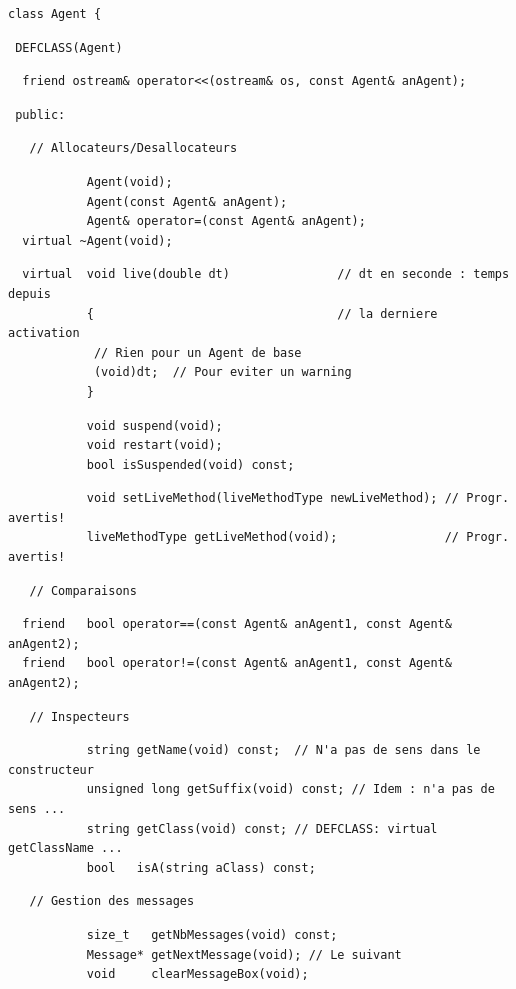 \documentclass[12pt]{article}
\begin{document}
\begin{small}
\begin{verbatim}
class Agent {
\end{verbatim}
\begin{verbatim}
 DEFCLASS(Agent)
\end{verbatim}
\begin{verbatim}
  friend ostream& operator<<(ostream& os, const Agent& anAgent);
\end{verbatim}
\begin{verbatim}
 public:
\end{verbatim}
\begin{verbatim}
   // Allocateurs/Desallocateurs
\end{verbatim}
\begin{verbatim}
           Agent(void);
           Agent(const Agent& anAgent);
           Agent& operator=(const Agent& anAgent);
  virtual ~Agent(void);
\end{verbatim}
\begin{verbatim}
  virtual  void live(double dt)               // dt en seconde : temps depuis
           {                                  // la derniere activation
            // Rien pour un Agent de base
            (void)dt;  // Pour eviter un warning
           }
\end{verbatim}
\begin{verbatim}
           void suspend(void);
           void restart(void);
           bool isSuspended(void) const;
\end{verbatim}
\begin{verbatim}
           void setLiveMethod(liveMethodType newLiveMethod); // Progr. avertis!
           liveMethodType getLiveMethod(void);               // Progr. avertis!
\end{verbatim}
\begin{verbatim}
   // Comparaisons
\end{verbatim}
\begin{verbatim}
  friend   bool operator==(const Agent& anAgent1, const Agent& anAgent2);
  friend   bool operator!=(const Agent& anAgent1, const Agent& anAgent2);
\end{verbatim}
\begin{verbatim}
   // Inspecteurs
\end{verbatim}
\begin{verbatim}
           string getName(void) const;  // N'a pas de sens dans le constructeur 
           unsigned long getSuffix(void) const; // Idem : n'a pas de sens ...
           string getClass(void) const; // DEFCLASS: virtual getClassName ... 
           bool   isA(string aClass) const;
\end{verbatim}
\begin{verbatim}
   // Gestion des messages
\end{verbatim}
\begin{verbatim}
           size_t   getNbMessages(void) const;
           Message* getNextMessage(void); // Le suivant
           void     clearMessageBox(void);


\end{verbatim}
\end{small}
\end{document}

